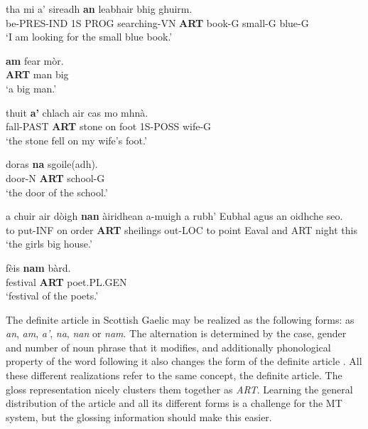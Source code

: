 \documentclass[11pt,a4paper]{article}
\begin{document}
\begin{exe}  
\ex 
\gll tha mi a' sireadh \textbf{an} leabhair bhig ghuirm.\\
be-PRES-IND 1S PROG searching-VN \textbf{ART} book-G small-G blue-G\\
\glt `I am looking for the small blue book.' \citep[p. 29]{lamb2001scottish}

\ex 
\gll \textbf{am} fear m\`or.\\
\textbf{ART} man big\\
\glt `a big man.' \citep[p. 31]{lamb2001scottish}

\ex
\gll thuit \textbf{a'} chlach air cas mo mhn\`a.\\
fall-PAST \textbf{ART} stone on foot 1S-POSS wife-G\\
\glt`the stone fell on my wife's foot.' \citep[p. 30]{lamb2001scottish} 	

\ex
\gll doras \textbf{na} sgoile(adh). \\
door-N \textbf{ART} school-G \\
\glt `the door of the school.' \citep[p. 29]{lamb2001scottish} 	

\ex 
\gll a chuir air d\`oigh \textbf{nan} \`airidhean a-muigh a rubh' Eubhal agus an oidhche seo. \\
to put-INF on order \textbf{ART} sheilings out-LOC to point Eaval and ART night this \\
\glt `the girls big house.' \citep[p. 100]{lamb2001scottish} 

\ex
\gll f\`eis \textbf{nam} b\`ard.\\
festival \textbf{ART} poet.PL.GEN\\
\glt `festival of the poets.' \citep[p. 107]{lamb2001scottish}

\end{exe}

The definite article in Scottish Gaelic may be realized as the following forms: as \textit{an}, \textit{am}, \textit{a'}, \textit{na}, \textit{nan} or \textit{nam}. The alternation is determined by the case, gender and number of noun phrase that it modifies, and additionally phonological property of the word following it also changes the form of the definite article \citep{lamb2001scottish}. All these different realizations refer to the same concept, the definite article. The gloss representation nicely clusters them together as \textit{ART}. Learning the general distribution of the article and all its different forms is a challenge for the MT system, but the glossing information should make this easier.
\end{document}
